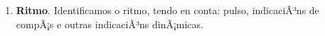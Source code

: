%

\begin{multicols}{2}

%
%
%
%
%
%
%
    \begin{enumerate}[1.-]
        \item %
        \textbf{Ritmo}. Identificamos o ritmo, tendo en conta: pulso, indicaciÃ³ns de compÃ¡s e outras indicaciÃ³ns dinÃ¡micas. 

\end{enumerate}
\end{multicols}
